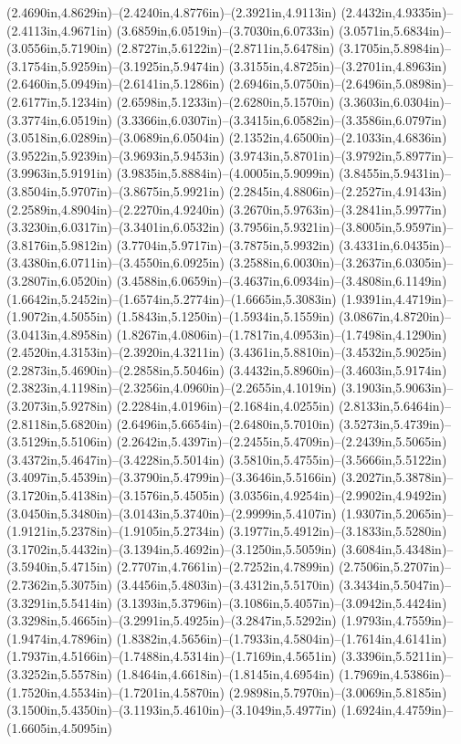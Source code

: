 (2.4690in,4.8629in)--(2.4240in,4.8776in)--(2.3921in,4.9113in) (2.4432in,4.9335in)--(2.4113in,4.9671in) (3.6859in,6.0519in)--(3.7030in,6.0733in) (3.0571in,5.6834in)--(3.0556in,5.7190in) (2.8727in,5.6122in)--(2.8711in,5.6478in) (3.1705in,5.8984in)--(3.1754in,5.9259in)--(3.1925in,5.9474in) (3.3155in,4.8725in)--(3.2701in,4.8963in) (2.6460in,5.0949in)--(2.6141in,5.1286in) (2.6946in,5.0750in)--(2.6496in,5.0898in)--(2.6177in,5.1234in) (2.6598in,5.1233in)--(2.6280in,5.1570in) (3.3603in,6.0304in)--(3.3774in,6.0519in) (3.3366in,6.0307in)--(3.3415in,6.0582in)--(3.3586in,6.0797in) (3.0518in,6.0289in)--(3.0689in,6.0504in) (2.1352in,4.6500in)--(2.1033in,4.6836in) (3.9522in,5.9239in)--(3.9693in,5.9453in) (3.9743in,5.8701in)--(3.9792in,5.8977in)--(3.9963in,5.9191in) (3.9835in,5.8884in)--(4.0005in,5.9099in) (3.8455in,5.9431in)--(3.8504in,5.9707in)--(3.8675in,5.9921in) (2.2845in,4.8806in)--(2.2527in,4.9143in) (2.2589in,4.8904in)--(2.2270in,4.9240in) (3.2670in,5.9763in)--(3.2841in,5.9977in) (3.3230in,6.0317in)--(3.3401in,6.0532in) (3.7956in,5.9321in)--(3.8005in,5.9597in)--(3.8176in,5.9812in) (3.7704in,5.9717in)--(3.7875in,5.9932in) (3.4331in,6.0435in)--(3.4380in,6.0711in)--(3.4550in,6.0925in) (3.2588in,6.0030in)--(3.2637in,6.0305in)--(3.2807in,6.0520in) (3.4588in,6.0659in)--(3.4637in,6.0934in)--(3.4808in,6.1149in) (1.6642in,5.2452in)--(1.6574in,5.2774in)--(1.6665in,5.3083in) (1.9391in,4.4719in)--(1.9072in,4.5055in) (1.5843in,5.1250in)--(1.5934in,5.1559in) (3.0867in,4.8720in)--(3.0413in,4.8958in) (1.8267in,4.0806in)--(1.7817in,4.0953in)--(1.7498in,4.1290in) (2.4520in,4.3153in)--(2.3920in,4.3211in) (3.4361in,5.8810in)--(3.4532in,5.9025in) (2.2873in,5.4690in)--(2.2858in,5.5046in) (3.4432in,5.8960in)--(3.4603in,5.9174in) (2.3823in,4.1198in)--(2.3256in,4.0960in)--(2.2655in,4.1019in) (3.1903in,5.9063in)--(3.2073in,5.9278in) (2.2284in,4.0196in)--(2.1684in,4.0255in) (2.8133in,5.6464in)--(2.8118in,5.6820in) (2.6496in,5.6654in)--(2.6480in,5.7010in) (3.5273in,5.4739in)--(3.5129in,5.5106in) (2.2642in,5.4397in)--(2.2455in,5.4709in)--(2.2439in,5.5065in) (3.4372in,5.4647in)--(3.4228in,5.5014in) (3.5810in,5.4755in)--(3.5666in,5.5122in) (3.4097in,5.4539in)--(3.3790in,5.4799in)--(3.3646in,5.5166in) (3.2027in,5.3878in)--(3.1720in,5.4138in)--(3.1576in,5.4505in) (3.0356in,4.9254in)--(2.9902in,4.9492in) (3.0450in,5.3480in)--(3.0143in,5.3740in)--(2.9999in,5.4107in) (1.9307in,5.2065in)--(1.9121in,5.2378in)--(1.9105in,5.2734in) (3.1977in,5.4912in)--(3.1833in,5.5280in) (3.1702in,5.4432in)--(3.1394in,5.4692in)--(3.1250in,5.5059in) (3.6084in,5.4348in)--(3.5940in,5.4715in) (2.7707in,4.7661in)--(2.7252in,4.7899in) (2.7506in,5.2707in)--(2.7362in,5.3075in) (3.4456in,5.4803in)--(3.4312in,5.5170in) (3.3434in,5.5047in)--(3.3291in,5.5414in) (3.1393in,5.3796in)--(3.1086in,5.4057in)--(3.0942in,5.4424in) (3.3298in,5.4665in)--(3.2991in,5.4925in)--(3.2847in,5.5292in) (1.9793in,4.7559in)--(1.9474in,4.7896in) (1.8382in,4.5656in)--(1.7933in,4.5804in)--(1.7614in,4.6141in) (1.7937in,4.5166in)--(1.7488in,4.5314in)--(1.7169in,4.5651in) (3.3396in,5.5211in)--(3.3252in,5.5578in) (1.8464in,4.6618in)--(1.8145in,4.6954in) (1.7969in,4.5386in)--(1.7520in,4.5534in)--(1.7201in,4.5870in) (2.9898in,5.7970in)--(3.0069in,5.8185in) (3.1500in,5.4350in)--(3.1193in,5.4610in)--(3.1049in,5.4977in) (1.6924in,4.4759in)--(1.6605in,4.5095in) 